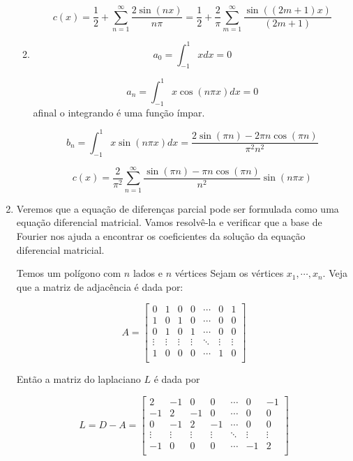 \documentclass{article}
\begin{document}
\begin{enumerate}
\begin{enumerate}
                        $$c(x) = \dfrac{1}{2} + \sum_{n=1}^\infty \dfrac{2\sin(nx)}{n\pi}
                        = \dfrac{1}{2} + \dfrac{2}{\pi}\sum_{m=1}^\infty \dfrac{\sin((2m+1)x)}{(2m+1)}$$

                    \item
                        $$a_0 = \int_{-1}^{1}x dx = 0$$
                        
                        $$a_n = \int_{-1}^{1} x\cos(n\pi x) dx = 0$$
                        afinal o integrando é uma função ímpar.

                        $$b_n = \int_{-1}^{1} x \sin(n\pi x) dx = \dfrac{2 \sin(\pi n) - 2 \pi n \cos(\pi n)}{\pi^2n^2}$$

                        $$c(x) = \dfrac{2}{\pi^2} \sum_{n=1}^{\infty} \dfrac{\sin(\pi n) - \pi n \cos(\pi n)}{n^2} \sin(n\pi x)$$
                \end{enumerate}

            \item Veremos que a equação de diferenças parcial pode ser formulada
                como uma equação diferencial matricial. Vamos resolvê-la e verificar 
                que a base de Fourier nos ajuda a encontrar os coeficientes da solução
                da equação diferencial matricial.

                Temos um polígono com $n$ lados e $n$ vértices
                Sejam os vértices $x_1, \cdots, x_n$.
                Veja que a matriz de adjacência é dada por:

                $$A = \begin{bmatrix}
                    0 & 1 & 0 & 0 & \cdots & 0 & 1 \\
                    1 & 0 & 1 & 0 &\cdots & 0 & 0 \\
                    0 & 1 & 0 & 1 &\cdots & 0 & 0 \\
                    \vdots & \vdots & \vdots & \vdots & \ddots & \vdots & \vdots \\
                    1 & 0 & 0 & 0 & \cdots & 1 & 0 \\
                \end{bmatrix}$$

                Então a matriz do laplaciano $L$ é dada por

                $$L = D - A = \begin{bmatrix}
                    2 & -1 & 0 & 0 & \cdots & 0 & -1 \\
                    -1 & 2 & -1 & 0 &\cdots & 0 & 0 \\
                    0 & -1 & 2 & -1 &\cdots & 0 & 0 \\
                    \vdots & \vdots & \vdots & \vdots & \ddots & \vdots & \vdots \\
                    -1 & 0 & 0 & 0 & \cdots & -1 & 2 \\
                \end{bmatrix}$$


\end{enumerate}
\end{document}
